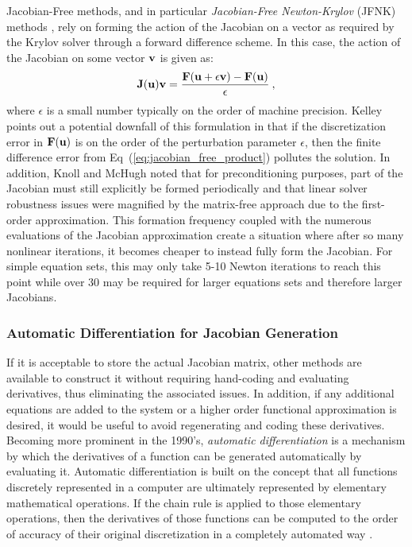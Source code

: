 Jacobian-Free methods, and in particular \textit{Jacobian-Free
  Newton-Krylov} (JFNK) methods \citep{knoll_jacobian-free_2004}, rely
on forming the action of the Jacobian on a vector as required by the
Krylov solver through a forward difference scheme. In this case, the
action of the Jacobian on some vector $\mathbf{v}$ is given as:
\begin{equation}
  \mathbf{J}(\mathbf{u})\mathbf{v} = \frac{\mathbf{F}(\mathbf{u} + \epsilon \mathbf{v}) -
    \mathbf{F}(\mathbf{u})}{\epsilon}\:,
  \label{eq:jacobian_free_product}
\end{equation}
where $\epsilon$ is a small number typically on the order of machine
precision. Kelley \citep{kelley_iterative_1995} points out a potential
downfall of this formulation in that if the discretization error in
$\mathbf{F}(\mathbf{u})$ is on the order of the perturbation parameter
$\epsilon$, then the finite difference error from
Eq~(\ref{eq:jacobian_free_product}) pollutes the solution. In
addition, Knoll and McHugh noted that for preconditioning purposes,
part of the Jacobian must still explicitly be formed periodically and
that linear solver robustness issues were magnified by the matrix-free
approach due to the first-order approximation. This formation
frequency coupled with the numerous evaluations of the Jacobian
approximation create a situation where after so many nonlinear
iterations, it becomes cheaper to instead fully form the
Jacobian. For simple equation sets, this may only take 5-10 Newton
iterations to reach this point while over 30 may be required for
larger equations sets and therefore larger Jacobians.

\subsubsection{Automatic Differentiation for Jacobian Generation}
\label{subsubsec:automatic_differentiation}
If it is acceptable to store the actual Jacobian matrix, other methods
are available to construct it without requiring hand-coding and
evaluating derivatives, thus eliminating the associated issues. In
addition, if any additional equations are added to the system or a
higher order functional approximation is desired, it would be useful
to avoid regenerating and coding these derivatives. Becoming more
prominent in the 1990's, \textit{automatic differentiation} is a
mechanism by which the derivatives of a function can be generated
automatically by evaluating it. Automatic differentiation is built on
the concept that all functions discretely represented in a computer
are ultimately represented by elementary mathematical operations. If
the chain rule is applied to those elementary operations, then the
derivatives of those functions can be computed to the order of
accuracy of their original discretization in a completely automated
way \citep{averick_computing_1994}.

